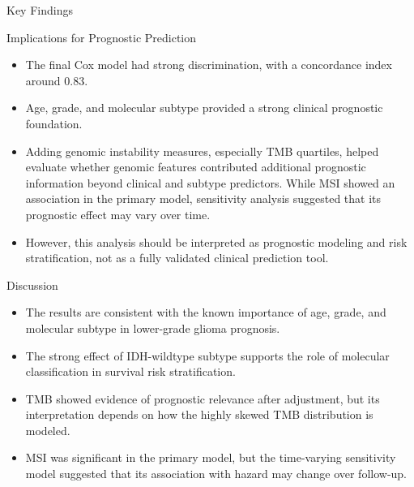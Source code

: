 \documentclass{beamer}
\begin{document}
\begin{frame}{Key Findings}
\end{frame}

\begin{frame}{Implications for Prognostic Prediction}
\begin{itemize}
    \item The final Cox model had strong discrimination, with a concordance index around 0.83.
    \item Age, grade, and molecular subtype provided a strong clinical prognostic foundation.
    \item Adding genomic instability measures, especially TMB quartiles, helped evaluate whether genomic features contributed additional prognostic information beyond clinical and subtype predictors. While MSI showed an association in the primary model, sensitivity analysis suggested that its prognostic effect may vary over time.
    \item However, this analysis should be interpreted as prognostic modeling and risk stratification, not as a fully validated clinical prediction tool. 
\end{itemize}
\end{frame}

\begin{frame}{Discussion}
\begin{itemize}
    \item The results are consistent with the known importance of age, grade, and molecular subtype in lower-grade glioma prognosis.
    \item The strong effect of IDH-wildtype subtype supports the role of molecular classification in survival risk stratification.
    \item TMB showed evidence of prognostic relevance after adjustment, but its interpretation depends on how the highly skewed TMB distribution is modeled.
    \item MSI was significant in the primary model, but the time-varying sensitivity model suggested that its association with hazard may change over follow-up.
\end{itemize}
\end{frame}
\end{document}
